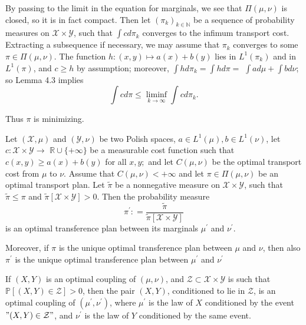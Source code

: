 By passing to the limit in the equation for marginals, we see that \( \Pi ( \mu , \nu ) \) is closed, so it is in fact compact. Then let \( \left( \pi _ { k } \right) _ { k \in \mathbb { N } } \) be a sequence of probability measures on \( \mathcal { X } \times \mathcal { Y } \), such that \( \int c d \pi _ { k } \) converges to the infimum transport cost. Extracting a subsequence if necessary, we may assume that \( \pi _ { k } \) converges to some \( \pi \in \Pi ( \mu , \nu ) . \) The function \( h: ( x , y ) \longmapsto a ( x ) + b ( y ) \) lies in \( L ^ { 1 } \left( \pi _ { k } \right) \) and in \( L ^ { 1 } ( \pi ) \), and \( c \geq h \) by assumption; moreover, \( \int h d \pi _ { k } = \int h d \pi = \) \( \int a d \mu + \int b d \nu \); so Lemma 4.3 implies
\[ \int c d \pi \leq \liminf _ { k \rightarrow \infty } \int c d \pi _ { k }. \]

Thus $\pi$ is minimizing.

\begin{thm}
	\label{thm:restriction_optimal_plan}
	Let \( (\mathcal { X } , \mu ) \)
	and \( ( \mathcal { Y } , \nu ) \) be two Polish spaces, \( a \in L ^ { 1 } ( \mu ) , b \in L ^ { 1 } ( \nu ) \), let \( c : \mathcal { X } \times \mathcal { Y } \rightarrow \)
	\( \mathbb { R } \cup \{ + \infty \} \) be a measurable cost function such that \( c ( x , y ) \geq a ( x ) + b ( y ) \)
	for all \( x , y ; \) and let \( C ( \mu , \nu ) \) be the optimal transport cost from \( \mu \) to \( \nu . \)
	Assume that \( C ( \mu , \nu ) < + \infty \) and let \( \pi \in \Pi ( \mu , \nu ) \) be an optimal transport plan. Let \( \widetilde { \pi } \) be a nonnegative measure on \( \mathcal { X } \times \mathcal { Y } \), such that \( \widetilde { \pi } \leq \pi \)
	and \( \widetilde { \pi } [ \mathcal { X } \times \mathcal { Y } ] > 0 . \) Then the probability measure
	\[ \pi ^ { \prime } : = \frac { \widetilde { \pi } } { \widetilde { \pi } [ \mathcal { X } \times \mathcal { Y } ] } \]
	is an optimal transference plan between its marginals \( \mu ^ { \prime } \) and \( \nu ^ { \prime } \).

	Moreover, if \( \pi \) is the unique optimal transference plan between \( \mu \)
	and \( \nu \), then also \( \pi ^ { \prime } \) is the unique optimal transference plan between \( \mu ^ { \prime } \)
	and \( \nu ^ { \prime } \)
\end{thm}

\begin{rmk}
If \( ( X , Y ) \) is an optimal coupling of \( ( \mu , \nu ) \), and \( \mathcal { Z } \subset \mathcal { X } \times \mathcal { Y } \)
is such that \( \mathbb { P } [ ( X , Y ) \in \mathcal { Z } ] > 0 \), then the pair \( ( X , Y ) \), conditioned
to lie in \( \mathcal { Z } \), is an optimal coupling of \( \left( \mu ^ { \prime } , \nu ^ { \prime } \right) \), where \( \mu ^ { \prime } \) is the law of
\( X \) conditioned by the event \( " ( X , Y ) \in \mathcal { Z } " \), and \( \nu ^ { \prime } \) is the law of \( Y \)
conditioned by the same event.
\end{rmk}
